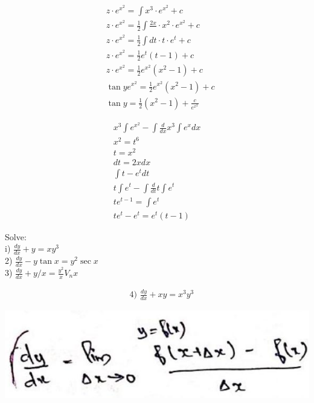 \documentclass[10pt]{article}
\begin{document}
$$
\begin{aligned}
& z \cdot e^{x^{2}}=\int x^{3} \cdot e^{x^{2}}+c \\
& z \cdot e^{x^{2}}=\frac{1}{2} \int \frac{2 x}{} \cdot x^{2} \cdot e^{x^{2}}+c \\
& z \cdot e^{x^{2}}=\frac{1}{2} \int d t \cdot t \cdot e^{t}+c \\
& z \cdot e^{x^{2}}=\frac{1}{2} e^{t}(t-1)+c \\
& z \cdot e^{x^{2}}=\frac{1}{2} e^{x^{2}}\left(x^{2}-1\right)+c \\
& \tan y e^{x^{2}}=\frac{1}{2} e^{x^{2}}\left(x^{2}-1\right)+c \\
& \tan y=\frac{1}{2}\left(x^{2}-1\right)+\frac{c}{e^{x^{2}}}
\end{aligned}
$$

$$
\begin{gathered}
x^{3} \int e^{x^{2}}-\int \frac{d}{d x} x^{3} \int e^{x} d x \\
x^{2}=t^{6} \\
t=x^{2} \\
d t=2 x d x \\
\int t-e^{t} d t \\
t \int e^{t}-\int \frac{d}{d t} t \int e^{t} \\
t e^{t-1}=\int e^{t} \\
t e^{t}-e^{t}=e^{t}(t-1)
\end{gathered}
$$

Solve:\\
i) $\frac{d y}{d x}+y=x y^{3}$\\
2) $\frac{d y}{d x}-y \tan x=y^{2} \sec x$\\
3) $\frac{d y}{d x}+y / x=\frac{y^{2}}{x} V_{n} x$

$$
\begin{aligned}
& \text { 4) } \frac{d y}{d x}+x y=x^{3} y^{3}
\end{aligned}
$$

\begin{center}
\includegraphics[max width=\textwidth]{2024_06_29_97217e818b79475761ffg-10}
\end{center}
\end{document}
